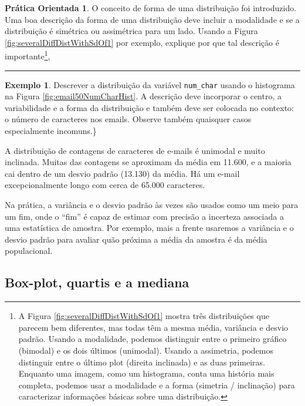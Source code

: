 \documentclass[
]{book}
\theoremstyle{definition}
\theoremstyle{definition}
\newtheorem{example}{Exemplo}[chapter]
\theoremstyle{definition}
\newtheorem{exercise}{Prática Orientada}[chapter]
\theoremstyle{definition}
\theoremstyle{remark}
\begin{document}
\begin{exercise}
\protect\hypertarget{exr:unnamed-chunk-25}{}{\label{exr:unnamed-chunk-25} }O conceito de forma de uma distribuição foi introduzido. Uma boa descrição da forma de uma distribuição deve incluir a modalidade e se a distribuição é simétrica ou assimétrica para um lado. Usando a Figura \ref{fig:severalDiffDistWithSdOf1} por exemplo, explique por que tal descrição é importante\footnote{A Figura \ref{fig:severalDiffDistWithSdOf1} mostra três distribuições que parecem bem diferentes, mas todas têm a mesma média, variância e desvio padrão. Usando a modalidade, podemos distinguir entre o primeiro gráfico (bimodal) e os dois últimos (unimodal). Usando a assimetria, podemos distinguir entre o último plot (direita inclinada) e as duas primeiras. Enquanto uma imagem, como um histograma, conta uma história mais completa, podemos usar a modalidade e a forma (simetria / inclinação) para caracterizar informações básicas sobre uma distribuição.},
\end{exercise}

\begin{center}\rule{0.5\linewidth}{0.5pt}\end{center}

\begin{example}
\protect\hypertarget{exm:unnamed-chunk-26}{}{\label{exm:unnamed-chunk-26} }Descrever a distribuição da variável \texttt{num\_char} usando o histograma na Figura \ref{fig:email50NumCharHist}. A descrição deve incorporar o centro, a variabilidade e a forma da distribuição e também deve ser colocada no contexto: o número de caracteres nos emails. Observe também quaisquer casos especialmente incomuns.\}
\end{example}

A distribuição de contagens de caracteres de e-mails é unimodal e muito inclinada. Muitas das contagens se aproximam da média em 11.600, e a maioria cai dentro de um desvio padrão (13.130) da média. Há um e-mail excepcionalmente longo com cerca de 65.000 caracteres.

Na prática, a variância e o desvio padrão às vezes são usados como um meio para um fim, onde o ``fim'' é capaz de estimar com precisão a incerteza associada a uma estatística de amostra. Por exemplo, mais a frente usaremos a variância e o desvio padrão para avaliar quão próxima a média da amostra é da média populacional.

\hypertarget{boxplotQuantileMedian}{%
\subsection{Box-plot, quartis e a mediana}\label{boxplotQuantileMedian}}
\end{document}
